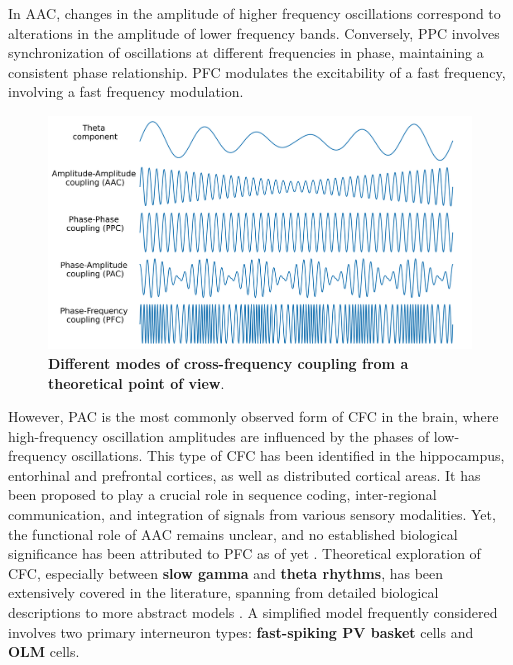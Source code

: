 \documentclass[../main.tex]{subfiles}
\begin{document}
In AAC, changes in the amplitude of higher frequency oscillations correspond to alterations in the amplitude of lower frequency bands.
Conversely, PPC involves synchronization of oscillations at different frequencies in phase, maintaining a consistent phase relationship. 
PFC modulates the excitability of a fast frequency, involving a fast frequency modulation.
\begin{figure}[!htb]
    \centering
    \includegraphics[width=\textwidth]{chapter4/figures/CFC-schematics.png}
    \caption{\textbf{Different modes of cross-frequency coupling from a theoretical point of view}.} 
    \label{fig:CFC-types}
\end{figure}
However, PAC is the most commonly observed form of CFC in the brain, where high-frequency oscillation amplitudes are influenced by the phases of low-frequency oscillations.
This type of CFC has been identified in the hippocampus, entorhinal and prefrontal cortices, as well as distributed cortical areas. 
It has been proposed to play a crucial role in sequence coding, inter-regional communication, and integration of signals from various sensory modalities.
Yet, the functional role of AAC remains unclear, and no established biological significance has been attributed to PFC as of yet \citep{canolty_high_2006, jirsa_cross-frequency_2013, hyafil_neural_2015, sotero2016topology, siebenhuhner2020genuine, siems_dissociated_2020}.
Theoretical exploration of CFC, especially between \textbf{slow gamma} and \textbf{theta rhythms}, has been extensively covered in the literature, spanning from detailed biological descriptions to more abstract models \citep{cutsuridis_hippocampal_2018}.
A simplified model frequently considered involves two primary interneuron types: \textbf{fast-spiking PV basket} cells and \textbf{OLM} cells.
\end{document}

